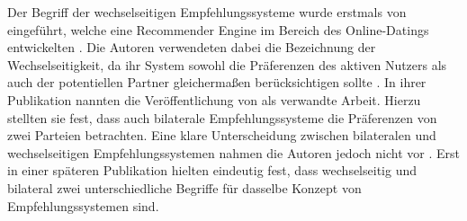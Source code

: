 Der Begriff der wechselseitigen Empfehlungssysteme wurde erstmals von \textcite[S. 1]{pizzato:2010} eingeführt, welche eine Recommender Engine im Bereich des Online-Datings entwickelten \cite[S. 1]{wenxing:2015}. Die Autoren verwendeten dabei die Bezeichnung der Wechselseitigkeit, da ihr System sowohl die Präferenzen des aktiven Nutzers als auch der potentiellen Partner gleichermaßen berücksichtigen sollte \cite[S. 1]{pizzato:2010}. In ihrer Publikation nannten \textcite[S. 3]{pizzato:2010} die Veröffentlichung von \textcite[S. 1ff.]{malinowski:2006} als verwandte Arbeit. Hierzu stellten sie fest, dass auch bilaterale Empfehlungssysteme die Präferenzen von zwei Parteien betrachten. Eine klare Unterscheidung zwischen bilateralen und wechselseitigen Empfehlungssystemen nahmen die Autoren jedoch nicht vor \cite[S. 3]{pizzato:2010}. Erst in einer späteren Publikation hielten \textcite[S. 8]{pizzato:2013} eindeutig fest, dass wechselseitig und bilateral zwei unterschiedliche Begriffe für dasselbe Konzept von Empfehlungssystemen sind.

